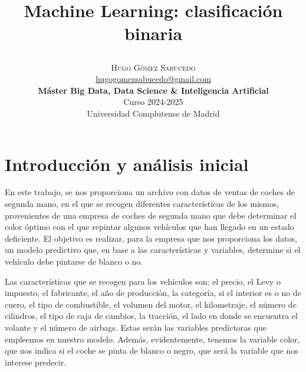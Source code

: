 \documentclass[a4paper,onecolumn]{extarticle}
\title{\begin{center} \Huge Machine Learning: clasificación binaria\end{center}} %
\author{
    \textsc{\Huge Hugo Gómez Sabucedo} \\ %
    \large \href{mailto:hugogomezsabucedo@gmail.com}{hugogomezsabucedo@gmail.com} \\ [2ex] %
    \Large \textbf{Máster Big Data, Data Science \& Inteligencia Artificial} \\
    \normalsize Curso 2024-2025 \\
    \large Universidad Complutense de Madrid
}
\date{} %
\let\stdsection\section
\renewcommand\section{\newpage\stdsection}
\begin{document}
\maketitle
\begin{sloppypar}


\section{Introducción y análisis inicial} \label{introduccion}
En este trabajo, se nos proporciona un archivo con datos de ventas de coches de segunda mano, en el que se recogen diferentes características de los mismos, 
provenientes de una empresa de coches de segunda mano que debe determinar el color óptimo con el que repintar algunos vehículos que han llegado en un estado 
deficiente. El objetivo es realizar, para la empresa que nos proporciona los datos, un modelo predictivo que, en base a las características y variables, determine
si el vehículo debe pintarse de blanco o no.

Las características que se recogen para los vehículos son: el precio, el Levy o impuesto, el fabricante, el año de producción, la categoría, si el interior es 
o no de cuero, el tipo de combustible, el volumen del motor, el kilometraje, el número de cilindros, el tipo de caja de cambios, la tracción, el lado en donde 
se encuentra el volante y el número de airbags. Estas serán las variables predictoras que empleemos en nuestro modelo. Además, evidentemente, tenemos la variable 
color, que nos indica si el coche se pinta de blanco o negro, que será la variable que nos interese predecir.


\end{sloppypar}
\end{document}
